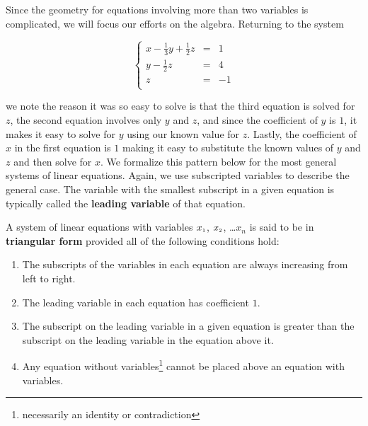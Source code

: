 Since the geometry for equations involving more than two variables is complicated, we will focus our efforts on the algebra.  Returning to the system 

\[ \left\{ \begin{array}{rcr} x-\frac{1}{3}y+\frac{1}{2}z  & = & 1 \\ [3pt]
y - \frac{1}{2} z & = & 4 \\ [3pt]
z & = & -1 \\ \end{array} \right.\] 

we note the reason it was so easy to solve is that the third equation is solved for $z$, the second equation involves only $y$ and $z$, and since the coefficient of $y$ is $1$, it makes it easy to solve for $y$ using our known value for $z$.  Lastly, the coefficient of  $x$ in the first equation is $1$ making it easy to substitute the known values of $y$ and $z$ and then solve for $x$.  We formalize this pattern below for the most general systems of linear equations.  Again, we use subscripted variables to describe the general case.  The variable with the smallest subscript in a given equation is typically called the  \textbf{leading variable} of that equation.

\smallskip
\colorbox{ResultColor}{\bbm  \begin{defn} \label{systemtriangularform} A system of linear equations with variables $x_{\mbox{\tiny$1$}}$, $x_{\mbox{\tiny$2$}}$, \ldots $x_{n}$ is said to be in   \textbf{triangular form} provided all of the following conditions hold:

\begin{enumerate}

\item  The subscripts of the variables in each equation are always increasing from left to right.

\item  The leading variable in each equation has coefficient $1$.

\item  The subscript on the leading variable in a given equation is greater than the subscript on the leading variable in the equation above it.

\item  Any equation without variables\footnote{necessarily an identity or contradiction} cannot be placed above an equation with variables.

\end{enumerate}

\end{defn}

\ebm}

